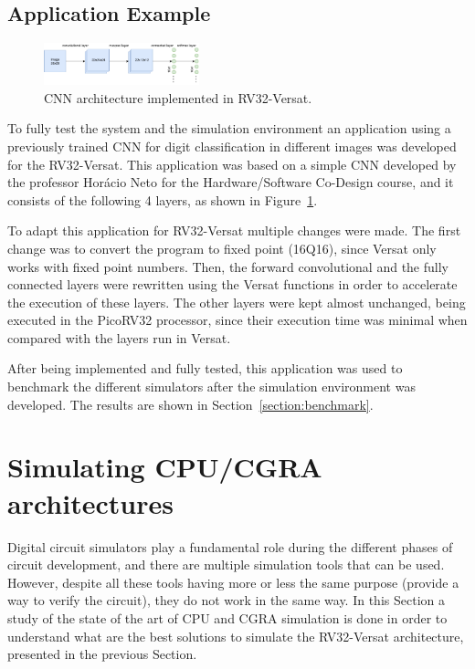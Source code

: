 \documentclass[conference]{IEEEtran}
\begin{document}
\subsection{Application Example}
\label{section:application}

\begin{figure}[!htb]
	\centering
	\includegraphics[width=0.4\textwidth]{Figures/CNN_architecture.pdf}
	\caption{CNN architecture implemented in RV32-Versat.}
	\label{fig:cnn}
\end{figure}

To fully test the system and the simulation environment an application using a previously
trained \ac{CNN} for digit classification in different images
was developed for the RV32-Versat. This application was based on a simple \ac{CNN} 
developed by the professor Horácio Neto for the Hardware/Software Co-Design course, and 
it consists of the following 4 layers, as shown in Figure~\ref{fig:cnn}.

To adapt this application for RV32-Versat multiple changes were made. The first
change was to convert the program to fixed point (16Q16), since Versat only
works with fixed point numbers. Then, the forward convolutional and the fully
connected layers were rewritten using the Versat functions in order to
accelerate the execution of these layers.  The other layers were kept almost
unchanged, being executed in the PicoRV32 processor, since their execution time
was minimal when compared with the layers run in Versat.

After being implemented and fully tested, this application was used to benchmark
the different simulators after the simulation environment was developed. The
results are shown in Section~\ref{section:benchmark}.


\section{Simulating CPU/CGRA architectures}
\label{chapter:simulators}

Digital circuit simulators play a fundamental role during the different phases
of circuit development, and there are multiple simulation tools that can be
used. However, despite all these tools having more or less the same purpose
(provide a way to verify the circuit), they do not work in the same way. In this
Section a study of the state of the art of \ac{CPU} and \ac{CGRA} simulation is
done in order to understand what are the best solutions to simulate the
RV32-Versat architecture, presented in the previous Section.
\end{document}
